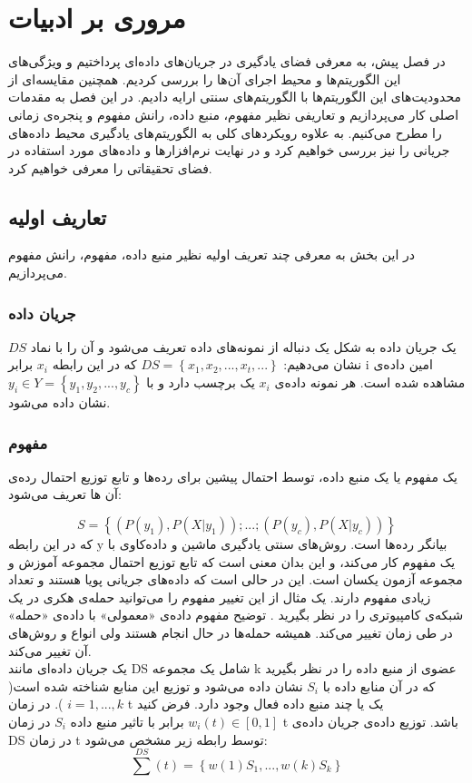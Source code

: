 
\chapter{مروری بر ادبیات}
\thispagestyle{empty}

در فصل پیش، به معرفی فضای یادگیری در جریان‌های داده‌ای پرداختیم  و ویژگی‌های این الگوریتم‌ها و محیط اجرای آن‌ها  را بررسی کردیم. همچنین مقایسه‌ای از محدودیت‌های این الگوریتم‌ها با الگوریتم‌های سنتی ارایه دادیم. در این فصل به مقدمات اصلی کار می‌پردازیم و تعاریفی نظیر مفهوم، منبع داده، رانش مفهوم و پنجره‌ی زمانی را مطرح می‌کنیم. به علاوه رویکردهای کلی به الگوریتم‌های یادگیری محیط داده‌های جریانی را نیز بررسی خواهیم کرد و در نهایت نرم‌افزارها و داده‌های مورد استفاده در فضای تحقیقاتی را معرفی خواهیم کرد.  

\section{تعاریف اولیه}\label{sec2}
در این بخش به معرفی چند تعریف اولیه نظیر منبع داده، مفهوم، رانش مفهوم می‌پردازیم.
\subsection{جریان داده}
یک جریان داده  به شکل یک دنباله از نمونه‌های داده تعریف می‌شود\cite{kelly1999impact} و آن را با نماد $DS$ نشان می‌دهیم:
$DS = \left\{ x_1, x_2, ..., x_t, ...\right\}$
که در این رابطه $x_i$ برابر i امین داده‌ی مشاهده شده است. هر نمونه داده‌ی $x_i$ یک برچسب دارد و با  $ y_i \in Y = \left\{y_1, y_2, ..., y_c\right\} $ نشان داده می‌شود.


\subsection{مفهوم}
یک مفهوم یا یک منبع داده، توسط احتمال پیشین برای رده‌ها و تابع توزیع احتمال رده‌‌ی آن ها تعریف می‌شود\cite{kelly1999impact}:

$$
S = \left\{(P(y_1), P(X|y_1));...;(P(y_c), P(X|y_c))\right\} 
$$
که در این رابطه y بیانگر رده‌ها است. روش‌های سنتی یادگیری ماشین و داده‌کاوی با یک مفهوم کار می‌کند، و این بدان معنی است که تابع توزیع احتمال مجموعه آموزش و مجموعه آزمون یکسان است. این در حالی است که داده‌های جریانی پویا هستند و تعداد زیادی مفهوم دارند. یک مثال از این تغییر مفهوم را می‌توانید حمله‌ی هکری در یک شبکه‌ی کامپیوتری را در نظر بگیرید\cite{Nguyen2015}
. توضیح مفهوم داده‌ی «معمولی» با داده‌ی «حمله» در طی زمان تغییر می‌کند. همیشه حمله‌ها در حال انجام هستند ولی انواع و روش‌های آن تغییر می‌کند.
\\
یک جریان داده‌ای مانند DS شامل یک مجموعه k عضوی از منبع داده را در نظر بگیرید که در آن منابع داده با $S_i$ نشان‌ داده می‌شود و توزیع این منابع شناخته شده است( $ i = 1, ..., k $ ). در زمان t یک یا چند منبع داده فعال وجود دارد. فرض کنید $w_i(t) \in [0, 1]$ برابر با تاثیر منبع داده  $S_i$ در زمان t باشد. توزیع داده‌ی جریان داده‌ی DS در زمان t توسط رابطه زیر مشخص می‌شود\cite{kelly1999impact}:
$$
\sum^{DS}(t) = \left\{ w(1)S_1, ..., w(k)S_k \right\}
$$

